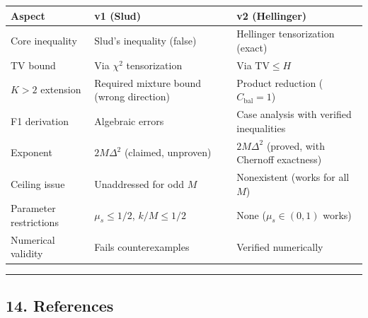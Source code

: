\documentclass[
  12pt,
]{article}
\begin{document}
\begin{longtable}[]{@{}
  >{\raggedright\arraybackslash}p{}
  >{\raggedright\arraybackslash}p{}
  >{\raggedright\arraybackslash}p{}@{}}
\toprule\noalign{}
\begin{minipage}[b]{\linewidth}\raggedright
Aspect
\end{minipage} & \begin{minipage}[b]{\linewidth}\raggedright
v1 (Slud)
\end{minipage} & \begin{minipage}[b]{\linewidth}\raggedright
v2 (Hellinger)
\end{minipage} \\
\midrule\noalign{}
\endhead
\bottomrule\noalign{}
\endlastfoot
Core inequality & Slud's inequality (false) & Hellinger tensorization
(exact) \\
TV bound & Via \(\chi^2\) tensorization & Via \(\text{TV} \leq H\) \\
\(K>2\) extension & Required mixture bound (wrong direction) & Product
reduction (\(C_{\text{bal}}=1\)) \\
F1 derivation & Algebraic errors & Case analysis with verified
inequalities \\
Exponent & \(2M\Delta^2\) (claimed, unproven) & \(2M\Delta^2\) (proved,
with Chernoff exactness) \\
Ceiling issue & Unaddressed for odd \(M\) & Nonexistent (works for all
\(M\)) \\
Parameter restrictions & \(\mu_s \leq 1/2\), \(k/M \leq 1/2\) & None
(\(\mu_s \in (0,1)\) works) \\
Numerical validity & Fails counterexamples & Verified numerically \\
\end{longtable}

\begin{center}\rule{0.5\linewidth}{0.5pt}\end{center}

\subsection{14. References}\label{references}
\end{document}

